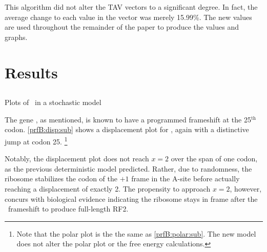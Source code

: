 \documentclass[12pt]{article}
\numberwithin{equation}{section}
\begin{document}
This algorithm did not alter the TAV vectors to a significant degree.
In fact, the average change to each value in the vector was merely
15.99\%.  The new values
are used throughout the remainder of the paper to produce the 
values and graphs.

\section{Results}
\subsection{\prfB}

\begin{cfigure}
  \caption{Plots of \prfB\ in a stochastic model}
  \label{prfB:stochplots}
\end{cfigure}

The gene \prfB, as mentioned, is known
to have a programmed frameshift at the 25$^{\textrm{th}}$ codon.
\autoref{prfB:disp:sub} shows a displacement plot for
\prfB, again with a distinctive jump at codon 25.
\footnote{Note that the polar plot is the the same as \autoref{prfB:polar:sub}.
The new model does not alter the polar plot or the free energy calculations.}

Notably, the displacement plot does not reach $x=2$ over the span of
one codon, as the previous deterministic model predicted.  Rather, due to randomness, the
ribosome stabilizes the codon of the $+1$ frame in the A-site before actually reaching
a displacement of exactly 2.  The propensity to approach $x=2$,
however, concurs with biological evidence indicating the ribosome
stays in frame after the \prfB\ frameshift to produce full-length RF2.
  
\end{document}
